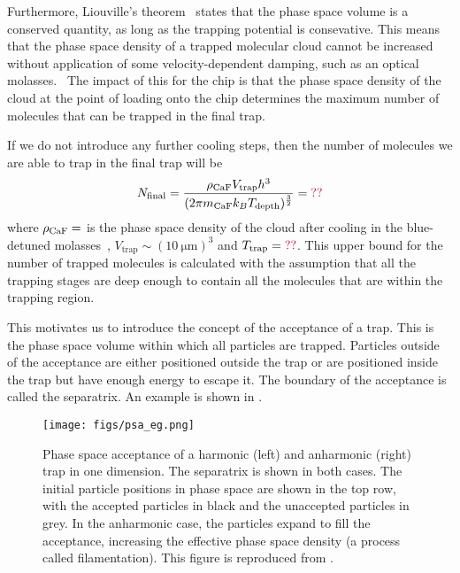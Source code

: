 Furthermore, Liouville's theorem~\cite{Landau1982, Hand1998} states that the
phase space volume is a conserved quantity, as long as the trapping potential
is consevative. This means that the phase space density of a trapped molecular
cloud cannot be increased without application of some velocity-dependent
damping, such as an optical molasses.~\cite{} The impact of this for the chip
is that the phase space density of the cloud at the point of loading onto the
chip determines the maximum number of molecules that can be trapped in the
final trap.


If we do not introduce any further cooling steps, then the number of molecules
we are able to trap in the final trap will be
%
\begin{equation}
  N_\text{final} = \frac{\rho_\text{CaF{}} V_\text{trap} h^3}{(2 \pi m_\text{CaF} k_B
  T_\text{depth})^\frac{3}{2}} = \textcolor{purple}{??}
  \label{design:eq:psd_N}
\end{equation}
%
where $\rho_\text{CaF{}} = $ is the phase space density of the \CaF{} cloud
after cooling in the blue-detuned molasses~\cite{Truppe2017},
$V_\text{trap}\sim(\SI{10}{\micro\meter})^3$ and $T_\text{trap}=\textcolor{purple}{??}$.
%
This upper bound for the number of trapped molecules is calculated with the
assumption that all the trapping stages are deep enough to contain all the
molecules that are within the trapping region. 

This motivates us to introduce the concept of the acceptance of a trap.
This is the phase space volume within which all particles are trapped.
Particles outside of the acceptance are either positioned outside the trap or
are positioned inside the trap but have enough energy to escape it. The
boundary of the acceptance is called the separatrix. An example is shown
in .~\cite{Lichtenberg1969, HanHand1998}

%
\begin{figure}
  \centering
  \texttt{[image: figs/psa\_eg.png]}
  \caption{
    Phase space acceptance of a harmonic (left) and anharmonic (right) trap in
    one dimension. The separatrix is shown in both cases. The initial particle
    positions in phase space are shown in the top row, with the accepted
    particles in black and the unaccepted particles in grey. In the anharmonic
    case, the particles expand to fill the acceptance, increasing the effective
    phase space density (a process called filamentation). This figure is
    reproduced from .
  }
  \label{design:fig:psaeg}
\end{figure}

